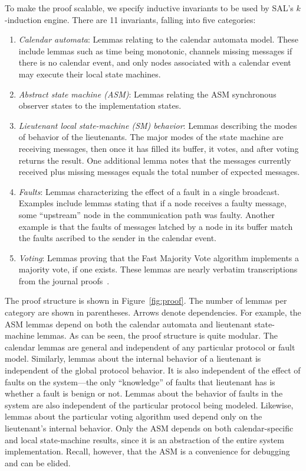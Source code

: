 \documentclass{llncs/llncs}
\begin{document}
To make the proof scalable, we specify inductive invariants to be used by SAL's $k$-induction engine. There are 11 invariants, falling into five categories:
\begin{enumerate}
  \item \emph{Calendar automata}: Lemmas relating to the calendar automata model. These include lemmas such as time being monotonic, channels missing messages if there is no calendar event, and only nodes associated with a calendar event may execute their local state machines.
  \item \emph{Abstract state machine (ASM)}: Lemmas relating the ASM synchronous observer states to the implementation states.
  \item \emph{Lieutenant local state-machine (SM) behavior}: Lemmas describing the modes of behavior of the lieutenants. The major modes of the state machine are receiving messages, then once it has filled its buffer, it votes, and after voting returns the result. One additional lemma notes that the messages currently received plus missing messages equals the total number of expected messages.
  \item \emph{Faults}: Lemmas characterizing the effect of a fault in a single broadcast. Examples include lemmas stating that if a node receives a faulty message, some ``upstream'' node in the communication path was faulty. Another example is that the faults of messages latched by a node in its buffer match the faults ascribed to the sender in the calendar event.
  \item \emph{Voting}: Lemmas proving that the Fast Majority Vote algorithm implements a majority vote, if one exists. These lemmas are nearly verbatim transcriptions from the journal proofs~\cite{mjrty}.
\end{enumerate}
\noindent
The proof structure is shown in Figure~\ref{fig:proof}. The number of lemmas per category are shown in parentheses. Arrows denote dependencies. For example, the ASM lemmas depend on both the calendar automata and lieutenant state-machine lemmas. As can be seen, the proof structure is quite modular. The calendar lemmas are general and independent of any particular protocol or fault model. Similarly, lemmas about the internal behavior of a lieutenant is independent of the global protocol behavior. It is also independent of the effect of faults on the system---the only ``knowledge'' of faults that lieutenant has is whether a fault is benign or not. Lemmas about the behavior of faults in the system are also independent of the particular protocol being modeled. Likewise, lemmas about the particular voting algorithm used depend only on the lieutenant's internal behavior. Only the ASM depends on both calendar-specific and local state-machine results, since it is an abstraction of the entire system implementation. Recall, however, that the ASM is a convenience for debugging and can be elided.
\end{document}
